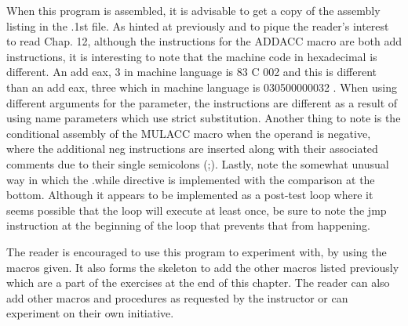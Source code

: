 \documentclass[10pt]{article}
\begin{document}
When this program is assembled, it is advisable to get a copy of the assembly listing in the .1st file. As hinted at previously and to pique the reader's interest to read Chap. 12, although the instructions for the ADDACC macro are both add instructions, it is interesting to note that the machine code in hexadecimal is different. An add eax, 3 in machine language is 83 C 002 and this is different than an add eax, three which in machine language is 030500000032 . When using different arguments for the parameter, the instructions are different as a result of using name parameters which use strict substitution. Another thing to note is the conditional assembly of the MULACC macro when the operand is negative, where the additional neg instructions are inserted along with their associated comments due to their single semicolons (;). Lastly, note the somewhat unusual way in which the .while directive is implemented with the comparison at the bottom. Although it appears to be implemented as a post-test loop where it seems possible that the loop will execute at least once, be sure to note the jmp instruction at the beginning of the loop that prevents that from happening.

The reader is encouraged to use this program to experiment with, by using the macros given. It also forms the skeleton to add the other macros listed previously which are a part of the exercises at the end of this chapter. The reader can also add other macros and procedures as requested by the instructor or can experiment on their own initiative.
\end{document}
